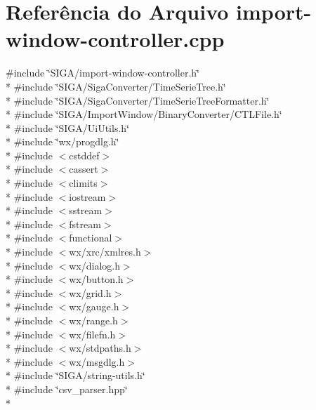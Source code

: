 \section{Referência do Arquivo import-\/window-\/controller.cpp}
\label{import-window-controller_8cpp}
{\ttfamily \#include \char`\"{}S\+I\+G\+A/import-\/window-\/controller.\+h\char`\"{}}\\*
{\ttfamily \#include \char`\"{}S\+I\+G\+A/\+Siga\+Converter/\+Time\+Serie\+Tree.\+h\char`\"{}}\\*
{\ttfamily \#include \char`\"{}S\+I\+G\+A/\+Siga\+Converter/\+Time\+Serie\+Tree\+Formatter.\+h\char`\"{}}\\*
{\ttfamily \#include \char`\"{}S\+I\+G\+A/\+Import\+Window/\+Binary\+Converter/\+C\+T\+L\+File.\+h\char`\"{}}\\*
{\ttfamily \#include \char`\"{}S\+I\+G\+A/\+Ui\+Utils.\+h\char`\"{}}\\*
{\ttfamily \#include \char`\"{}wx/progdlg.\+h\char`\"{}}\\*
{\ttfamily \#include $<$cstddef$>$}\\*
{\ttfamily \#include $<$cassert$>$}\\*
{\ttfamily \#include $<$climits$>$}\\*
{\ttfamily \#include $<$iostream$>$}\\*
{\ttfamily \#include $<$sstream$>$}\\*
{\ttfamily \#include $<$fstream$>$}\\*
{\ttfamily \#include $<$functional$>$}\\*
{\ttfamily \#include $<$wx/xrc/xmlres.\+h$>$}\\*
{\ttfamily \#include $<$wx/dialog.\+h$>$}\\*
{\ttfamily \#include $<$wx/button.\+h$>$}\\*
{\ttfamily \#include $<$wx/grid.\+h$>$}\\*
{\ttfamily \#include $<$wx/gauge.\+h$>$}\\*
{\ttfamily \#include $<$wx/range.\+h$>$}\\*
{\ttfamily \#include $<$wx/filefn.\+h$>$}\\*
{\ttfamily \#include $<$wx/stdpaths.\+h$>$}\\*
{\ttfamily \#include $<$wx/msgdlg.\+h$>$}\\*
{\ttfamily \#include \char`\"{}S\+I\+G\+A/string-\/utils.\+h\char`\"{}}\\*
{\ttfamily \#include \char`\"{}csv\+\_\+parser.\+hpp\char`\"{}}\\*
